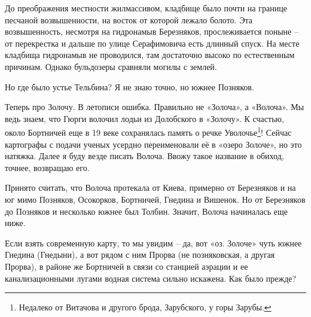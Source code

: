 
До преображения местности жилмассивом, кладбище было почти на границе песчаной возвышенности, на восток от которой лежало болото. Эта возвышенность, несмотря на гидронамыв Березняков, прослеживается поныне – от перекрестка и дальше по улице Серафимовича есть длинный спуск. На месте кладбища гидронамыв не проводился, там достаточно высоко по естественным причинам. Однако бульдозеры сравняли могилы с землей.




Но где было устье Тельбина? Я не знаю точно, но южнее Позняков.

Теперь про Золочу. В летописи ошибка. Правильно не «Золоча», а «Волоча». Мы ведь знаем, что Гюрги волочил лодьи из Долобского в «Золочу». К счастью, около Бортничей еще в 19 веке сохранялась память о речке Уволочье\footnote{Недалеко от Витачова и другого брода, Зарубского, у горы Зарубы.}! Сейчас картографы с подачи ученых усердно переименовали её в «озеро Золоче», но это натяжка. Далее я буду везде писать Волоча. Ввожу такое название в обиход, точнее, возвращаю его.

Принято считать, что Волоча протекала от Киева, примерно от Березняков и на юг мимо Позняков, Осокорков, Бортничей, Гнедина и Вишенок. Но от Березняков до Позняков и несколько южнее был Толбин. Значит, Волоча начиналась еще ниже.

Если взять современную карту, то мы увидим – да, вот «оз. Золоче» чуть южнее Гнедина (Гнедыни), а вот рядом с ним Прорва (не позняковская, а другая Прорва), в районе же Бортничей в связи со станцией аэрации и ее канализационными лугами водная система сильно искажена. Как было прежде?

